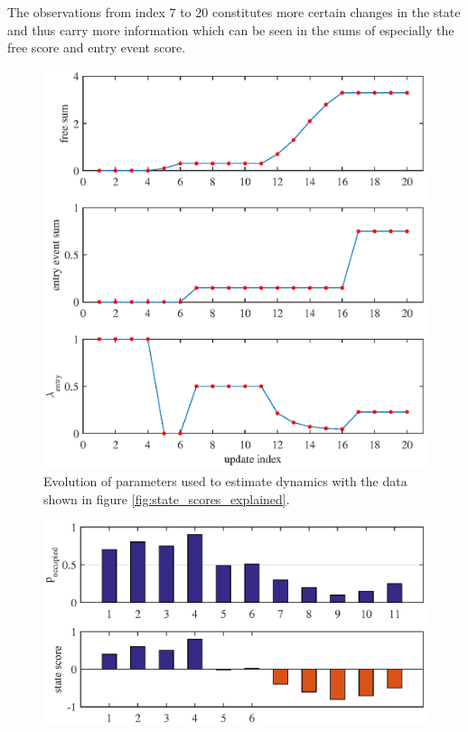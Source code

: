 The observations from index $7$ to $20$ constitutes more certain changes in the state and thus carry more information which can be seen in the sums of especially the free score and entry event score. 

\begin{figure}[htbp]
    \centering
    \includegraphics[scale=1]{chapters/mapping_of_dynamic_areas/figures/pmac_entry_explained}
    \caption{Evolution of parameters used to estimate dynamics with the data shown in figure \ref{fig:state_scores_explained}.}
    \label{fig:pmac_entry_explained}
\end{figure}


\begin{figure}[htbp]
\centering
\includegraphics[scale=1]{chapters/mapping_of_dynamic_areas/figures/pmac_noise_problem_case}
\caption{}
\label{fig:pmac_noise_problem_case}
\end{figure}


